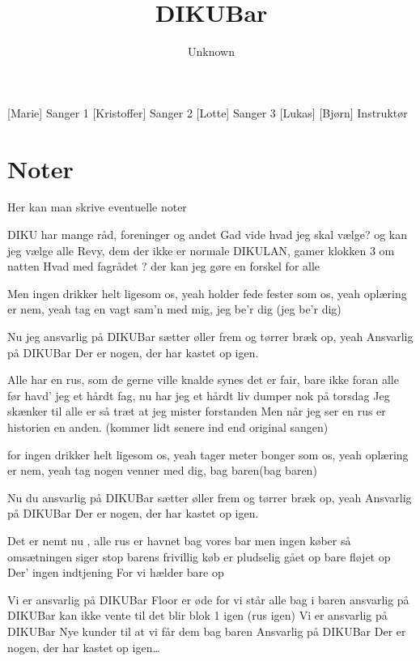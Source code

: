\documentclass[a4paper,11pt]{article}
\title{DIKUBar}
\author{Unknown}
\begin{document}
\maketitle

\begin{roles}
[Marie] Sanger 1
[Kristoffer] Sanger 2
[Lotte]  Sanger 3
[Lukas] 
[Bjørn] Instruktør
\end{roles} 

\section*{Noter}
Her kan man skrive eventuelle noter 

\begin{props}
\prop{}
\prop{}
\prop{}
\prop{}
\prop{}
\prop{}
\end{props}



\begin{song}
 DIKU har mange råd, foreninger og andet
Gad vide hvad jeg skal vælge?
og kan jeg vælge alle
Revy, dem der ikke er normale
DIKULAN, gamer klokken 3 om natten
Hvad med fagrådet ?
der kan jeg gøre en forskel for alle

Men ingen drikker helt ligesom os, yeah
holder fede fester som os, yeah
oplæring er nem, yeah
tag en vagt sam’n med mig, jeg be’r dig (jeg be’r dig)

Nu jeg ansvarlig på DIKUBar
sætter øller frem og tørrer bræk op, yeah
Ansvarlig på DIKUBar
Der er nogen, der har kastet op igen.

Alle har en rus, som de gerne ville knalde
synes det er fair, bare ikke foran alle
før havd’ jeg et hårdt fag, nu har jeg et hårdt liv
dumper nok på torsdag
Jeg skænker til alle
er så træt at jeg mister forstanden
Men når jeg ser en
rus er historien en anden. (kommer lidt senere ind end original sangen)

for ingen drikker helt ligesom os, yeah
tager meter bonger som os, yeah
oplæring er nem, yeah
tag nogen venner med dig, bag baren(bag baren)

Nu du ansvarlig på DIKUBar
sætter øller frem og tørrer bræk op, yeah
Ansvarlig på DIKUBar
Der er nogen, der har kastet op igen.

Det er nemt nu  , alle rus er havnet bag vores bar 
men ingen køber så omsætningen siger stop
barens frivillig køb er pludselig gået op
bare fløjet op
Der’ ingen indtjening
For vi hælder bare op

Vi er ansvarlig på DIKUBar
Floor er øde for vi står alle bag i baren
ansvarlig på DIKUBar
kan ikke vente til det blir blok 1 igen (rus igen)
Vi er ansvarlig på DIKUBar
Nye kunder til at vi får dem bag baren
Ansvarlig på DIKUBar
Der er nogen, der har kastet op igen…
\end{song}
\end{document}
